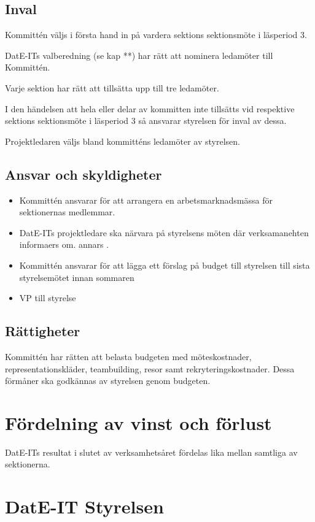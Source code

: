 \documentclass{article}
\begin{document}
\subsection{Inval}
Kommittén väljs i första hand in på vardera sektions sektionsmöte i läsperiod 3.

DatE-ITs valberedning (se kap **) har rätt att nominera ledamöter till Kommittén.

Varje sektion har rätt att tillsätta upp till tre ledamöter. 

I den händelsen att hela eller delar av kommitten inte tillsätts vid respektive sektions sektionsmöte i läsperiod 3 så ansvarar styrelsen för inval av dessa.

Projektledaren väljs bland kommitténs ledamöter av styrelsen.


\subsection{Ansvar och skyldigheter}
\begin{itemize}
    \item Kommittén ansvarar för att arrangera en arbetsmarknadsmässa för sektionernas medlemmar. 
    \item DatE-ITs projektledare ska närvara på styrelsens möten där verksamanehten informaers om. annars .
    \item Kommittén ansvarar för att lägga ett förslag på budget till styrelsen till sista styrelsemötet innan sommaren
    \item VP till styrelse
\end{itemize}

\subsection{Rättigheter}
Kommittén har rätten att belasta budgeten med möteskostnader, representationskläder, teambuilding, resor samt rekryteringskostnader. Dessa förmåner ska godkännas av styrelsen genom budgeten.

\section{Fördelning av vinst och förlust}
DatE-ITs resultat i slutet av verksamhetsåret fördelas lika mellan samtliga av sektionerna.

\section{DatE-IT Styrelsen}
\end{document}
